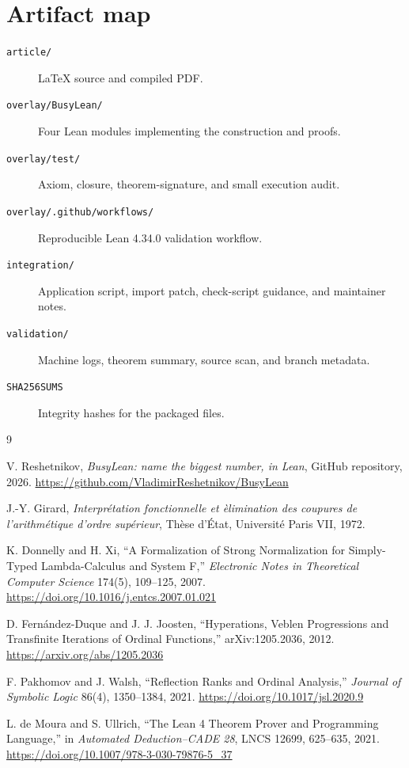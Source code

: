 \documentclass[11pt]{article}
\theoremstyle{definition}
\newcommand{\code}[1]{\texttt{#1}}
\begin{document}
\section{Artifact map}

\begin{description}
\item[\code{article/}] LaTeX source and compiled PDF.
\item[\code{overlay/BusyLean/}] Four Lean modules implementing the construction and proofs.
\item[\code{overlay/test/}] Axiom, closure, theorem-signature, and small execution audit.
\item[\code{overlay/.github/workflows/}] Reproducible Lean 4.34.0 validation workflow.
\item[\code{integration/}] Application script, import patch, check-script guidance, and maintainer notes.
\item[\code{validation/}] Machine logs, theorem summary, source scan, and branch metadata.
\item[\code{SHA256SUMS}] Integrity hashes for the packaged files.
\end{description}

\begin{thebibliography}{9}

V. Reshetnikov,
\emph{BusyLean: name the biggest number, in Lean},
GitHub repository, 2026.
\url{https://github.com/VladimirReshetnikov/BusyLean}

J.-Y. Girard,
\emph{Interpr\'etation fonctionnelle et \`elimination des coupures de l'arithm\'etique d'ordre sup\'erieur},
Th\`ese d'\'Etat, Universit\'e Paris VII, 1972.

K. Donnelly and H. Xi,
``A Formalization of Strong Normalization for Simply-Typed Lambda-Calculus and System F,''
\emph{Electronic Notes in Theoretical Computer Science} 174(5), 109--125, 2007.
\url{https://doi.org/10.1016/j.entcs.2007.01.021}

D. Fern\'andez-Duque and J. J. Joosten,
``Hyperations, Veblen Progressions and Transfinite Iterations of Ordinal Functions,''
arXiv:1205.2036, 2012.
\url{https://arxiv.org/abs/1205.2036}

F. Pakhomov and J. Walsh,
``Reflection Ranks and Ordinal Analysis,''
\emph{Journal of Symbolic Logic} 86(4), 1350--1384, 2021.
\url{https://doi.org/10.1017/jsl.2020.9}

L. de Moura and S. Ullrich,
``The Lean 4 Theorem Prover and Programming Language,''
in \emph{Automated Deduction--CADE 28}, LNCS 12699, 625--635, 2021.
\url{https://doi.org/10.1007/978-3-030-79876-5_37}

\end{thebibliography}
\end{document}
